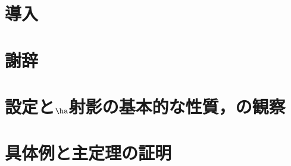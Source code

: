 \documentclass[12pt,dvipdfmx,uplatex]{jsarticle}
\begin{document}


\newgeometry{}

\makeatletter

\renewcommand*{\l@section}[2]{%
  \ifnum \c@tocdepth >\z@
    \addpenalty{\@secpenalty}%
    \addvspace{1.0em \@plus\p@}%
    \begingroup
      \parindent\z@
      \rightskip\@tocrmarg
      \parfillskip-\rightskip
      \leavevmode\headfont
      \setlength\@lnumwidth{1.5em}%
      \advance\leftskip\@lnumwidth \hskip-\leftskip
      #1\nobreak
      \leaders\hbox{\normalfont$\m@th \mkern \@dotsep mu\hbox{.}\mkern \@dotsep mu$}\hfill %
      \nobreak\hbox to\@pnumwidth{\hss#2}\par
    \endgroup
  \fi}

\makeatother


\tableofcontents

\clearpage

\section*{導入}


\section*{謝辞}

% 

\clearpage

\section{設定と$\ha$射影の基本的な性質，の観察}



\section{具体例と主定理の証明}




\begin{thebibliography}{99}
  
\end{thebibliography}
\end{document}
